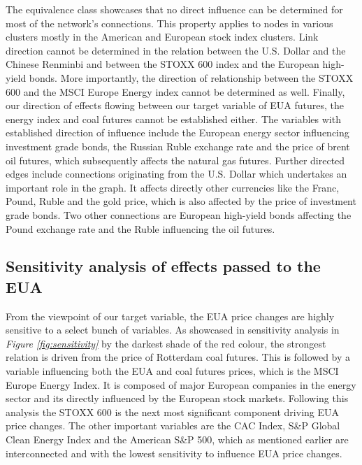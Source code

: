 \documentclass[12pt, letterpaper]{article}
\begin{document}
The equivalence class showcases that no direct influence can be determined for most of the network’s connections. This property applies to nodes in various clusters mostly in the American and European stock index clusters. Link direction cannot be determined in the relation between the U.S. Dollar and the Chinese Renminbi and between the STOXX 600 index and the European high-yield bonds. More importantly, the direction of relationship between the STOXX 600 and the MSCI Europe Energy index cannot be determined as well. Finally, our direction of effects flowing between our target variable of EUA futures, the energy index and coal futures cannot be established either. The variables with established direction of influence include the European energy sector influencing investment grade bonds, the Russian Ruble exchange rate and the price of brent oil futures, which subsequently affects the natural gas futures. Further directed edges include connections originating from the U.S. Dollar which undertakes an important role in the graph. It affects directly other currencies like the Franc, Pound, Ruble and the gold price, which is also affected by the price of investment grade bonds. Two other connections are European high-yield bonds affecting the Pound exchange rate and the Ruble influencing the oil futures.

\subsection{Sensitivity analysis of effects passed to the EUA}

From the viewpoint of our target variable, the EUA price changes are highly sensitive to a select bunch of variables. As showcased in sensitivity analysis in \textit{Figure \ref{fig:sensitivity}} by the darkest shade of the red colour, the strongest relation is driven from the price of Rotterdam coal futures. This is followed by a variable influencing both the EUA and coal futures prices, which is the MSCI Europe Energy Index. It is composed of major European companies in the energy sector and its directly influenced by the European stock markets. Following this analysis the STOXX 600 is the next most significant component driving EUA price changes. The other important variables are the CAC Index, S\&P Global Clean Energy Index and the American S\&P 500, which as mentioned earlier are interconnected and with the lowest sensitivity to influence EUA price changes.
\end{document}

